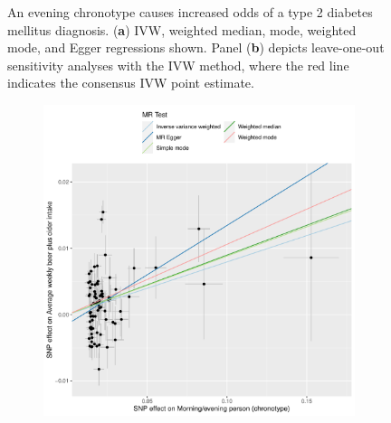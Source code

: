 \documentclass[genes,article,accept,moreauthors,pdftex]{Definitions/mdpi}
\begin{document}
\begin{figure}[H]
{\begin{subfigure}{.5\linewidth}
\caption{}
\label{t2dmLoo}
\end{subfigure}}
\caption{An evening chronotype causes increased odds of a type 2 diabetes mellitus diagnosis. (\textbf{a}) IVW, weighted median, mode, weighted mode, and Egger regressions shown. Panel (\textbf{b}) depicts leave-one-out sensitivity analyses with the IVW method, where the red line indicates the consensus IVW point estimate.}
\label{t2dm}
\end{figure}
\unskip
\begin{figure}[H]
{\captionsetup{position=bottom,justification=centering}
\begin{subfigure}{.5\linewidth}
\centering
	\includegraphics[width=\linewidth]{Figs/Analysis2/Morning_evening_person_(chronotype)_vs_Average_weekly_beer_plus_cider_intake.Scatterplots.pdf}
\caption{}
\label{beerScatter}
\end{subfigure}
\begin{subfigure}{.5\linewidth}
\centering

\end{subfigure}}
\end{figure}
\end{document}
